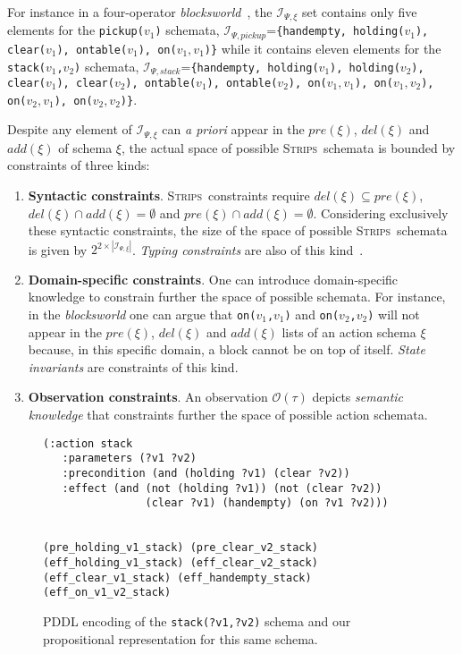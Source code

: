 \documentclass{article}
\newcommand{\strips}{\textsc{Strips}}
\begin{document}
For instance in a four-operator {\em blocksworld}~\cite{slaney2001blocks}, the ${\mathcal I}_{\Psi,\xi}$ set contains only five elements for the {\small \tt pickup($v_1$)} schemata, ${\mathcal I}_{\Psi,pickup}$={\small\tt\{handempty, holding($v_1$), clear($v_1$), ontable($v_1$), on($v_1,v_1$)\}} while it contains eleven elements for the {\small \tt stack($v_1$,$v_2$)} schemata, ${\mathcal I}_{\Psi,stack}$={\small\tt\{handempty, holding($v_1$), holding($v_2$), clear($v_1$), clear($v_2$), ontable($v_1$), ontable($v_2$), on($v_1,v_1$), on($v_1,v_2$), on($v_2,v_1$), on($v_2,v_2$)\}}. 

Despite any element of ${\mathcal I}_{\Psi,\xi}$ can {\em a priori} appear in the $pre(\xi)$, $del(\xi)$ and $add(\xi)$ of schema $\xi$, the actual space of possible \strips\ schemata is bounded by constraints of three kinds:
\begin{enumerate}
\item {\bf Syntactic constraints}. \strips\ constraints require $del(\xi)\subseteq pre(\xi)$, $del(\xi)\cap add(\xi)=\emptyset$ and $pre(\xi)\cap add(\xi)=\emptyset$. Considering exclusively these syntactic constraints, the size of the space of possible \strips\ schemata is given by $2^{2\times|{\mathcal I}_{\Psi,\xi}|}$. {\em Typing constraints} are also of this kind~\cite{mcdermott1998pddl}. 
\item {\bf Domain-specific constraints}. One can introduce domain-specific knowledge to constrain further the space of possible schemata. For instance, in the {\em blocksworld} one can argue that {\small\tt on($v_1$,$v_1$)} and {\small\tt on($v_2$,$v_2$)} will not appear in the $pre(\xi)$, $del(\xi)$ and $add(\xi)$ lists of an action schema $\xi$ because, in this specific domain, a block cannot be on top of itself. {\it State invariants} are constraints of this kind. 
\item {\bf Observation constraints}. An observation $\mathcal{O}(\tau)$ depicts {\em semantic knowledge} that constraints further the space of possible action schemata.   
\end{enumerate}

\begin{figure}
  \begin{tiny}  
  \begin{verbatim}
(:action stack
   :parameters (?v1 ?v2)
   :precondition (and (holding ?v1) (clear ?v2))
   :effect (and (not (holding ?v1)) (not (clear ?v2))
                (clear ?v1) (handempty) (on ?v1 ?v2)))


(pre_holding_v1_stack) (pre_clear_v2_stack)
(eff_holding_v1_stack) (eff_clear_v2_stack)
(eff_clear_v1_stack) (eff_handempty_stack) (eff_on_v1_v2_stack)
  \end{verbatim}           
  \end{tiny}  
 \caption{\small PDDL encoding of the {\tt\small stack(?v1,?v2)} schema and our propositional representation for this same schema.}
\label{fig:propositional}
\end{figure}
\end{document}
